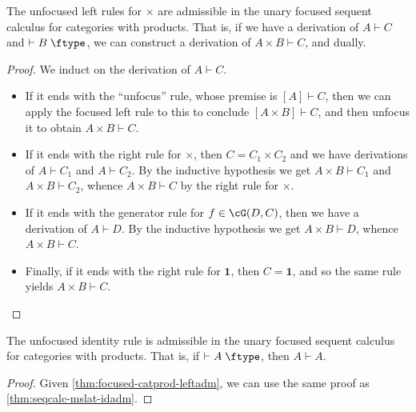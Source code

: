 \documentclass{book}
\let\types\vdash
\def\type{\;\ftype}
\newcommand{\focus}[1]{[#1]}
\def\unit{\mathbf{1}}
\begin{document}
\begin{lem}\label{thm:focused-catprod-leftadm}
  The unfocused left rules for $\times$ are admissible in the unary focused sequent calculus for categories with products.
  That is, if we have a derivation of $A\types C$ and $\types B\type$, we can construct a derivation of $A\times B\types C$, and dually.
\end{lem}
\begin{proof}
  We induct on the derivation of $A\types C$.
  \begin{itemize}
  \item If it ends with the ``unfocus'' rule, whose premise is $\focus A\types C$, then we can apply the focused left rule to this to conclude $\focus{A\times B}\types C$, and then unfocus it to obtain $A\times B\types C$.
  \item If it ends with the right rule for $\times$, then $C=C_1\times C_2$ and we have derivations of $A\types C_1$ and $A\types C_2$.
    By the inductive hypothesis we get $A\times B\types C_1$ and $A\times B\types C_2$, whence $A\times B\types C$ by the right rule for $\times$.
  \item If it ends with the generator rule for $f\in \cG(D,C)$, then we have a derivation of $A\types D$.
    By the inductive hypothesis we get $A\times B\types D$, whence $A\times B\types C$.
  \item Finally, if it ends with the right rule for $\unit$, then $C=\unit$, and so the same rule yields $A\times B\types C$.\qedhere
  \end{itemize}
\end{proof}

\begin{lem}\label{thm:focused-catprod-idadm}
  The unfocused identity rule is admissible in the unary focused sequent calculus for categories with products.
  That is, if $\types A\type$, then $A\types A$.
\end{lem}
\begin{proof}
  Given \cref{thm:focused-catprod-leftadm}, we can use the same proof as \cref{thm:seqcalc-mslat-idadm}.
\end{proof}
\end{document}
